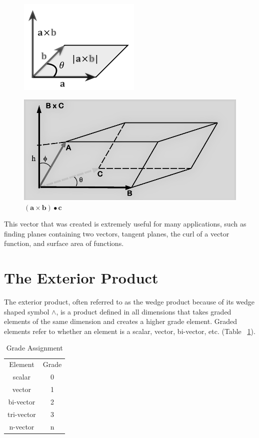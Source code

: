 \documentclass{amsart}
\begin{document}
		\begin{figure}
			\label{crosspic}
			\includegraphics[width=.4\linewidth]{Cross_Product_Internet}
			\caption{}
		\end{figure}
		\begin{figure}
		\label{parallelepiped}
		\includegraphics[width=.5\linewidth]{Parallelepiped_Internet}
		\caption{$(\mathbf{a} \times \mathbf{b}) \bullet \mathbf{c}$}
	\end{figure}
				
	This vector that was created is extremely useful for many applications, such as finding planes containing two vectors, tangent planes, the curl of a vector function, and surface area of functions.
	
	
	\section{The Exterior Product} \label{ext}
		The exterior product, often referred to as the wedge product because of its wedge shaped symbol $\wedge$, is a product defined in all dimensions that takes graded elements of the same dimension and creates a higher grade element. Graded elements refer to whether an element is a scalar, vector, bi-vector, etc. (Table ~\ref{tb:1}).
		
		\begin{table}[h]
			\caption{Grade Assignment}
			\label{tb:1}
			\begin{tabular}{c | c}
				Element & Grade\\
				scalar & 0\\
				vector & 1\\
				bi-vector & 2\\
				tri-vector & 3\\
				n-vector & n
			\end{tabular}
		\end{table}
	
\end{document}
